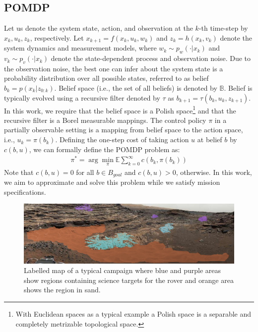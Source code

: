 \documentclass[conference]{IEEEtran}
\begin{document}
	\subsection{POMDP}\label{sec:POMDP}
	Let us denote the system state, action, and observation at the $k$-th time-step by $x_k, u_k, z_k$, respectively. Let $x_{k+1}=f(x_k,u_k,w_k)$ and $z_k=h(x_k,v_k)$ denote the system dynamics and measurement models, where $w_k\sim p_w(\cdot|x_k)$ and $v_k\sim p_v(\cdot|x_k)$ denote the state-dependent process and observation noise. Due to the observation noise, the best one can infer about the system state is a probability distribution over all possible states, referred to as belief $b_k=p(x_k|z_{0:k})$. Belief space (i.e., the set of all beliefs) is denoted by $\mathbb{B}$. Belief is typically evolved using a recursive filter denoted by $\tau$ as $b_{k+1}=\tau(b_k,u_k,z_{k+1})$.
    {\color{red} In this work, we require that the belief space is a Polish space\footnote{With Euclidean spaces as a typical example a Polish space is a separable and completely metrizable topological space. } and that the recursive filter is a Borel measurable mappings.}
%
%
    The control policy $\pi$ in a partially observable setting is a mapping from belief space to the action space, i.e., $u_k=\pi(b_k)$. Defining the one-step cost of taking action $u$ at belief $b$ by $c(b,u)$, we can formally define the POMDP problem as: 
    \begin{align}
    \pi^*=\arg\min_\pi\mathbb{E}\sum_{k=0}^{\infty}c(b_k,\pi(b_k))
    \end{align}
    Note that $c(b,u)=0$ for all $b\in B_{goal}$ and $c(b,u)>0$, otherwise. In this work, we aim to approximate and solve this problem while we satisfy mission specifications.
    
    
	\begin{figure}[t!]
    	\centering
    	\includegraphics[width=2\columnwidth]{figs/MarsLabelledWithSand.png}
    	\caption{Labelled map of a typical campaign where blue and purple areas show regions containing science targets for the rover and orange area shows the region in sand.}
    	\label{fig:Scenario}
    \end{figure}
    
\end{document}
